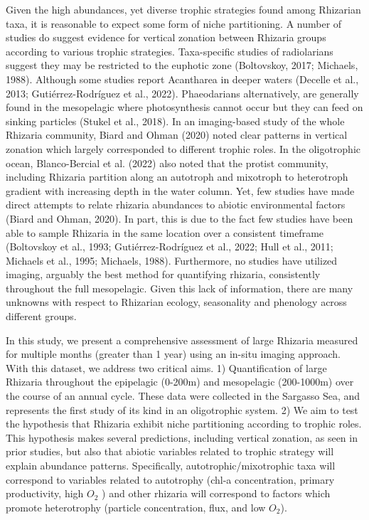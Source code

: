 \documentclass[
  letterpaper,
  DIV=11,
  numbers=noendperiod]{scrartcl}
\begin{document}
Given the high abundances, yet diverse trophic strategies found among
Rhizarian taxa, it is reasonable to expect some form of niche
partitioning. A number of studies do suggest evidence for vertical
zonation between Rhizaria groups according to various trophic
strategies. Taxa-specific studies of radiolarians suggest they may be
restricted to the euphotic zone (Boltovskoy, 2017; Michaels, 1988).
Although some studies report Acantharea in deeper waters (Decelle et
al., 2013; Gutiérrez-Rodríguez et al., 2022). Phaeodarians
alternatively, are generally found in the mesopelagic where
photosynthesis cannot occur but they can feed on sinking particles
(Stukel et al., 2018). In an imaging-based study of the whole Rhizaria
community, Biard and Ohman (2020) noted clear patterns in vertical
zonation which largely corresponded to different trophic roles. In the
oligotrophic ocean, Blanco-Bercial et al. (2022) also noted that the
protist community, including Rhizaria partition along an autotroph and
mixotroph to heterotroph gradient with increasing depth in the water
column. Yet, few studies have made direct attempts to relate rhizaria
abundances to abiotic environmental factors (Biard and Ohman, 2020). In
part, this is due to the fact few studies have been able to sample
Rhizaria in the same location over a consistent timeframe (Boltovskoy et
al., 1993; Gutiérrez-Rodríguez et al., 2022; Hull et al., 2011; Michaels
et al., 1995; Michaels, 1988). Furthermore, no studies have utilized
imaging, arguably the best method for quantifying rhizaria, consistently
throughout the full mesopelagic. Given this lack of information, there
are many unknowns with respect to Rhizarian ecology, seasonality and
phenology across different groups.

In this study, we present a comprehensive assessment of large Rhizaria
measured for multiple months (greater than 1 year) using an in-situ
imaging approach. With this dataset, we address two critical aims. 1)
Quantification of large Rhizaria throughout the epipelagic (0-200m) and
mesopelagic (200-1000m) over the course of an annual cycle. These data
were collected in the Sargasso Sea, and represents the first study of
its kind in an oligotrophic system. 2) We aim to test the hypothesis
that Rhizaria exhibit niche partitioning according to trophic roles.
This hypothesis makes several predictions, including vertical zonation,
as seen in prior studies, but also that abiotic variables related to
trophic strategy will explain abundance patterns. Specifically,
autotrophic/mixotrophic taxa will correspond to variables related to
autotrophy (chl-a concentration, primary productivity, high \(O_2\) )
and other rhizaria will correspond to factors which promote heterotrophy
(particle concentration, flux, and low \(O_2\)).
\end{document}
